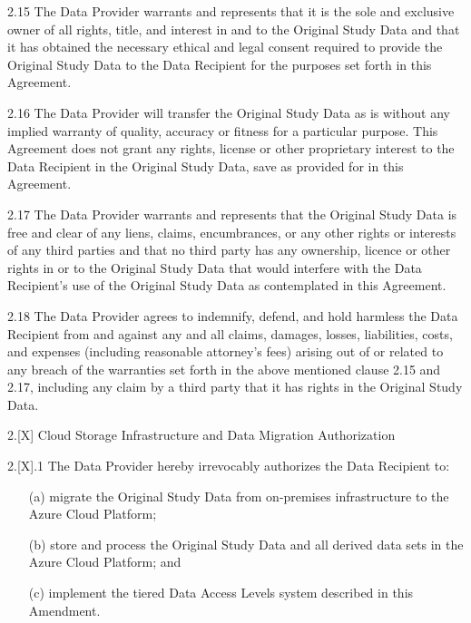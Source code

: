 \documentclass[12pt,letterpaper]{article}
\newcommand{\added}[1]{\textcolor{addcolor}{#1}}
\begin{document}
2.15 The Data Provider warrants and represents that it is the sole and exclusive owner of all rights, title, and interest in and to the Original Study Data and that it has obtained the necessary ethical and legal consent required to provide the Original Study Data to the Data Recipient for the purposes set forth in this Agreement.

2.16 The Data Provider will transfer the Original Study Data as is without any implied warranty of quality, accuracy or fitness for a particular purpose. This Agreement does not grant any rights, license or other proprietary interest to the Data Recipient in the Original Study Data, save as provided for in this Agreement.

2.17 The Data Provider warrants and represents that the Original Study Data is free and clear of any liens, claims, encumbrances, or any other rights or interests of any third parties and that no third party has any ownership, licence or other rights in or to the Original Study Data that would interfere with the Data Recipient's use of the Original Study Data as contemplated in this Agreement.

2.18 The Data Provider agrees to indemnify, defend, and hold harmless the Data Recipient from and against any and all claims, damages, losses, liabilities, costs, and expenses (including reasonable attorney's fees) arising out of or related to any breach of the warranties set forth in the above mentioned clause 2.15 and 2.17, including any claim by a third party that it has rights in the Original Study Data.

\added{2.[X] Cloud Storage Infrastructure and Data Migration Authorization}

\added{2.[X].1 The Data Provider hereby irrevocably authorizes the Data Recipient to:
\begin{enumerate}
\item[(a)] migrate the Original Study Data from on-premises infrastructure to the Azure Cloud Platform;
\item[(b)] store and process the Original Study Data and all derived data sets in the Azure Cloud Platform; and
\item[(c)] implement the tiered Data Access Levels system described in this Amendment.
\end{enumerate}}
\end{document}
